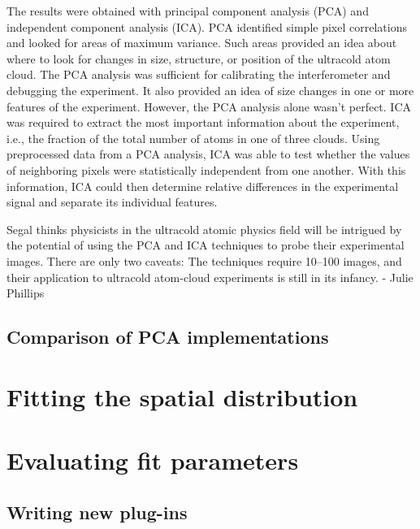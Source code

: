 The results were obtained with principal component analysis (PCA) and independent component analysis (ICA). PCA identified simple pixel correlations and looked for areas of maximum variance. Such areas provided an idea about where to look for changes in size, structure, or position of the ultracold atom cloud. The PCA analysis was sufficient for calibrating the interferometer and debugging the experiment. It also provided an idea of size changes in one or more features of the experiment. However, the PCA analysis alone wasn’t perfect. ICA was required to extract the most important information about the experiment, i.e., the fraction of the total number of atoms in one of three clouds. Using preprocessed data from a PCA analysis, ICA was able to test whether the values of neighboring pixels were statistically independent from one another. With this information, ICA could then determine relative differences in the experimental signal and separate its individual features.

Segal thinks physicists in the ultracold atomic physics field will be intrigued by the potential of using the PCA and ICA techniques to probe their experimental images. There are only two caveats: The techniques require 10–100 images, and their application to ultracold atom-cloud experiments is still in its infancy.   - Julie Phillips

\subsection{Comparison of PCA implementations}

\section{Fitting the spatial distribution}

\section{Evaluating fit parameters}

\subsection{Writing new plug-ins}